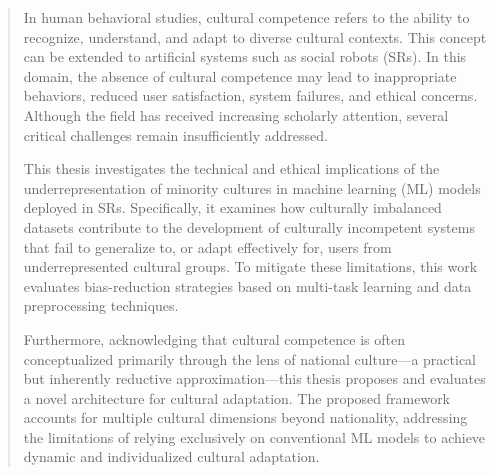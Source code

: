 \begin{abstract}
In human behavioral studies, cultural competence refers to the ability to recognize, understand, and adapt to diverse cultural contexts. 
This concept can be extended to artificial systems such as social robots (SRs).
In this domain, the absence of cultural competence may lead to inappropriate behaviors, reduced user satisfaction, system failures, and ethical concerns. 
Although the field has received increasing scholarly attention, several critical challenges remain insufficiently addressed.

This thesis investigates the technical and ethical implications of the underrepresentation of minority cultures in machine learning (ML) models deployed in SRs. 
Specifically, it examines how culturally imbalanced datasets contribute to the development of culturally incompetent systems that fail to generalize to, or adapt effectively for, users from underrepresented cultural groups. To mitigate these limitations, this work evaluates bias-reduction strategies based on multi-task learning and data preprocessing techniques.

Furthermore, acknowledging that cultural competence is often conceptualized primarily through the lens of national culture—a practical but inherently reductive approximation—this thesis proposes and evaluates a novel architecture for cultural adaptation. The proposed framework accounts for multiple cultural dimensions beyond nationality, addressing the limitations of relying exclusively on conventional ML models to achieve dynamic and individualized cultural adaptation.
\end{abstract}

